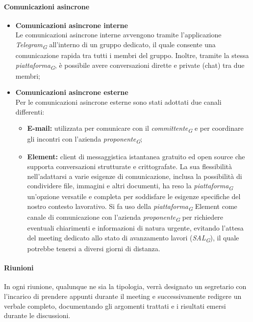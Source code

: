 \paragraph{Comunicazioni asincrone}
\begin{itemize}
	\item \textbf{Comunicazioni asincrone interne} \\
	Le comunicazioni asincrone interne avvengono tramite l'applicazione \textit{Telegram}\textsubscript{\textit{G}} all'interno di un gruppo dedicato, il quale consente una comunicazione rapida tra tutti i membri del gruppo. Inoltre, tramite la stessa \textit{piattaforma}\textsubscript{\textit{G}}, è possibile avere conversazioni dirette e private (chat) tra due membri;
	
	\item \textbf{Comunicazioni asincrone esterne} \\
	Per le comunicazioni asincrone esterne sono stati adottati due canali differenti:
	\begin{itemize}
		\item \textbf{E-mail:} utilizzata per comunicare con il \textit{committente}\textsubscript{\textit{G}} e per coordinare gli incontri con l'azienda \textit{proponente}\textsubscript{\textit{G}};
		\item \textbf{Element:} client di messaggistica istantanea gratuito ed open source che supporta conversazioni strutturate e crittografate. La sua flessibilità nell'adattarsi a varie esigenze di comunicazione, inclusa la possibilità di condividere file, immagini e altri documenti, ha reso la \textit{piattaforma}\textsubscript{\textit{G}} un'opzione versatile e completa per soddisfare le esigenze specifiche del nostro contesto lavorativo. Si fa uso della \textit{piattaforma}\textsubscript{\textit{G}} Element come canale di comunicazione con l'azienda \textit{proponente}\textsubscript{\textit{G}} per richiedere eventuali chiarimenti e informazioni di natura urgente, evitando l'attesa del meeting dedicato allo stato di avanzamento lavori (\textit{SAL}\textsubscript{\textit{G}}), il quale potrebbe tenersi a diversi giorni di distanza.
	\end{itemize}
\end{itemize}
\pagebreak

\paragraph*{Riunioni}
In ogni riunione, qualunque ne sia la tipologia, verrà designato un segretario con l'incarico di prendere appunti durante il meeting e successivamente redigere un verbale completo, documentando gli argomenti trattati e i risultati emersi durante le discussioni.

